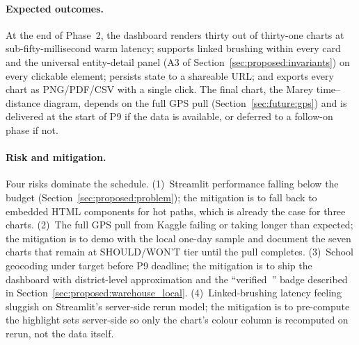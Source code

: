\paragraph{Expected outcomes.}
At the end of Phase~2, the dashboard renders thirty out of
thirty-one charts at sub-fifty-millisecond warm latency;
supports linked brushing within every card and the universal
entity-detail panel (A3 of
Section~\ref{sec:proposed:invariants}) on every clickable
element; persists state to a shareable URL; and exports every
chart as PNG/PDF/CSV with a single click. The final chart, the
Marey time--distance diagram, depends on the full GPS pull
(Section~\ref{sec:future:gps}) and is delivered at the start
of P9 if the data is available, or deferred to a follow-on
phase if not.

\paragraph{Risk and mitigation.}
Four risks dominate the schedule. (1)~Streamlit performance
falling below the budget
(Section~\ref{sec:proposed:problem}); the mitigation is to fall
back to embedded HTML components for hot paths, which is
already the case for three charts. (2)~The full GPS pull from
Kaggle failing or taking longer than expected; the mitigation
is to demo with the local one-day sample and document the
seven charts that remain at SHOULD/WON'T tier until the pull
completes. (3)~School geocoding under target before P9
deadline; the mitigation is to ship the dashboard with
district-level approximation and the
``verified~\checkmark'' badge described in
Section~\ref{sec:proposed:warehouse_local}.
(4)~Linked-brushing latency feeling sluggish on Streamlit's
server-side rerun model; the mitigation is to pre-compute the
highlight sets server-side so only the chart's colour column
is recomputed on rerun, not the data itself.
